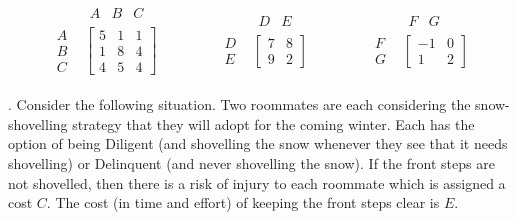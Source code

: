 \documentclass[reqno,12pt]{amsart}
\begin{document}
\noindent
$$
\begin{matrix}
\begin{matrix}
  & \begin{matrix} A & B & C \end{matrix}       \\
\begin{matrix} A \\ B \\ C \end{matrix}         &
\begin{bmatrix}
5 & 1 & 1       \\
1 & 8 & 4       \\
4 & 5 & 4
\end{bmatrix}
\end{matrix}
& \qquad &
\begin{matrix}
& \begin{matrix} D & E \end{matrix}   \\
\begin{matrix} D \\ E \end{matrix}              &
\begin{bmatrix}
7 & 8   \\
9 & 2
\end{bmatrix}
\end{matrix}
& \qquad &
\begin{matrix}
& \begin{matrix} F & G \end{matrix}   \\
\begin{matrix} F \\ G \end{matrix}              &
\begin{bmatrix}
-1 & 0   \\
1 & 2
\end{bmatrix}
\end{matrix}
\end{matrix}
$$

\vspace{1cm}

.  Consider the following situation.  Two roommates are each
considering the snow-shovelling strategy that they will adopt
for the coming winter.  Each has the option of being Diligent
(and shovelling the snow whenever they see that it needs shovelling)
or Delinquent (and never shovelling the snow).  If the front steps
are not shovelled, then there is a risk of injury to each roommate
which is assigned a cost $C$.  The cost (in time and effort) of
keeping the front steps clear is $E$.
\end{document}
